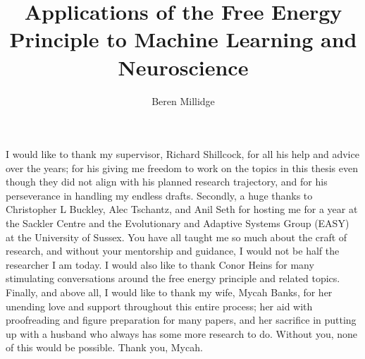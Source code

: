 \documentclass[phd,ianc,oneside,logo,doublespacing,sansheadings,romanprepages,parskip]{infthesis}
\title{Applications of the Free Energy Principle to Machine Learning and Neuroscience}
\author{Beren Millidge}
\begin{document}
\begin{preliminary}

%
%
%


\maketitle

\begin{acknowledgements}
I would like to thank my supervisor, Richard Shillcock, for all his help and advice over the years; for his giving me freedom to work on the topics in this thesis even though they did not align with his planned research trajectory, and for his perseverance in handling my endless drafts. Secondly, a huge thanks to Christopher L Buckley, Alec Tschantz, and Anil Seth for hosting me for a year at the Sackler Centre and the Evolutionary and Adaptive Systems Group (EASY) at the University of Sussex. You have all taught me so much about the craft of research, and without your mentorship and guidance, I would not be half the researcher I am today. I would also like to thank Conor Heins for many stimulating conversations around the free energy principle and related topics. Finally, and above all, I would like to thank my wife, Mycah Banks, for her unending love and support throughout this entire process; her aid with proofreading and figure preparation for many papers, and her sacrifice in putting up with a husband who always has some more research to do. Without you, none of this would be possible. Thank you, Mycah.
\end{acknowledgements}

\standarddeclaration



\tableofcontents

 \listoffigures

\end{preliminary}

\end{document}
